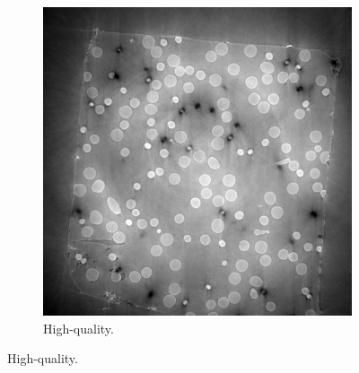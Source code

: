 \begin{figure}
  \begin{subfigure}[t]{\textwidth}
    \centering
    \includegraphics[width=.45\textwidth]{figures/gt32.png}
    \caption{High-quality. }
  \end{subfigure}

  \medskip


\end{figure}
